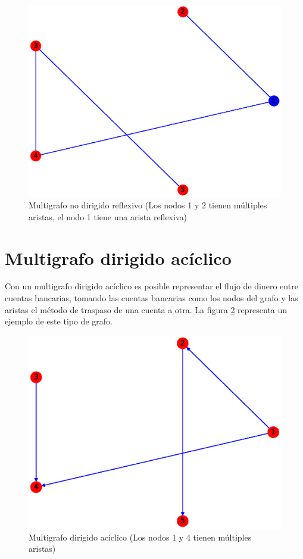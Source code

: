 \documentclass{article}
\begin{document}
\begin{figure}[h!]
    \includegraphics[width=\textwidth]{9-MNDR}
    \caption{Multigrafo no dirigido reflexivo (Los nodos 1 y 2 tienen múltiples aristas, el nodo 1 tiene una arista reflexiva)}
    \label{fig:MNDR}
\end{figure}



\section{Multigrafo dirigido acíclico}
Con un multigrafo dirigido acíclico es posible representar el flujo de dinero entre cuentas bancarias, tomando las cuentas bancarias como los nodos del grafo y las aristas el método de traspaso de una cuenta a otra. La figura \ref{fig:MDA} representa un ejemplo de este tipo de grafo.
\begin{figure}[h!]
    \includegraphics[width=\textwidth]{10-MDA}
    \caption{Multigrafo dirigido acíclico (Los nodos 1 y 4 tienen múltiples aristas)}
    \label{fig:MDA}
\end{figure}
\end{document}
